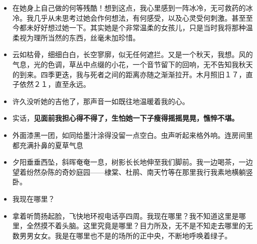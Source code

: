 \documentclass[UTF8,a4paper,8pt]{ctexbook}
\begin{document}
\begin{itemize}
		\item 在她身上自己做的何等残酷！想到这点，我心里感到一阵冰冷，无可救药的冰冷。我几乎从未思考过她会作何想法，有何感受，以及心灵受何刺激。甚至至今都未好好想过她一下。其实她是个非常温柔的女孩儿，只是当时我将那种温柔视为理所当然的东西，丝毫未加珍惜。
		\item 云如枯骨，细细白白，长空寥廓，似无任何遮拦。又是一个秋天，我想。风的气息，光的色调，草丛中点缀的小花，一个音节留下的回响，无不告知我秋天的到来。四季更迭，我与死者之间的距离亦随之渐渐拉开。木月照旧１７，直子依然２１，直至永远。
		\item 许久没听她的吉他了，那声音一如既往地温暖着我的心。
		\item 实话，\textbf{见面前我担心得不得了，生怕她一下子瘦得摇摇晃晃，憔悴不堪。}
		\item 外面漆黑一团，如同给墨汁涂得没留一点空白。虫声听起来格外响。连房间里都充满扑鼻的夏草气息
		\item 夕阳垂垂西坠，斜晖奄奄一息，树影长长地伸至我们脚前。我一边喝茶，一边望着纷然杂陈的奇妙庭园——棣棠、杜鹃、南天竹等在那里我行我素地横躺竖卧。
		\item 我现在哪里？
		\item 拿着听筒扬起脸，飞快地环视电话亭四周。我现在哪里？我不知道这里是哪里，全然摸不着头脑。这里究竟是哪里？目力所及，无不是不知走去哪里的无数男男女女。我是在哪里也不是的场所的正中央，不断地呼唤着绿子。
	\end{itemize}
\newpage
\end{document}
